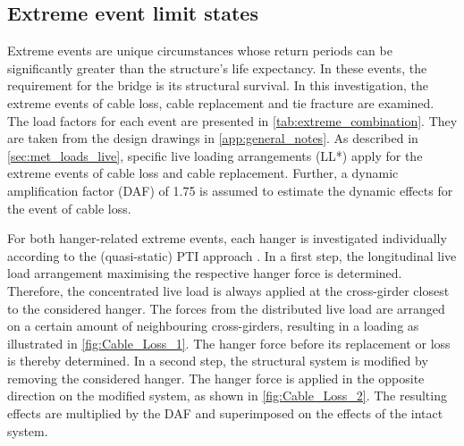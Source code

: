 \subsection{Extreme event limit states}\label{sec:extreme}
Extreme events are unique circumstances whose return periods can be significantly greater than the structure's life expectancy. In these events, the requirement for the bridge is its structural survival. In this investigation, the extreme events of cable loss, cable replacement and tie fracture are examined. The load factors for each event are presented in \cref{tab:extreme_combination}. They are taken from the design drawings in \cref{app:general_notes}. As described in \cref{sec:met_loads_live}, specific live loading arrangements (LL*) apply for the extreme events of cable loss and cable replacement. Further, a dynamic amplification factor (DAF) of 1.75 is assumed to estimate the dynamic effects for the event of cable loss.



For both hanger-related extreme events, each hanger is investigated individually according to the (quasi-static) PTI approach \cite{PTI}. In a first step, the longitudinal live load arrangement maximising the respective hanger force is determined. Therefore, the concentrated live load is always applied at the cross-girder closest to the considered hanger. The forces from the distributed live load are arranged on a certain amount of neighbouring cross-girders, resulting in a loading as illustrated in \cref{fig:Cable_Loss_1}. The hanger force before its replacement or loss is thereby determined. In a second step, the structural system is modified by removing the considered hanger. The hanger force is applied in the opposite direction on the modified system, as shown in \cref{fig:Cable_Loss_2}. The resulting effects are multiplied by the DAF and superimposed on the effects of the intact system.

